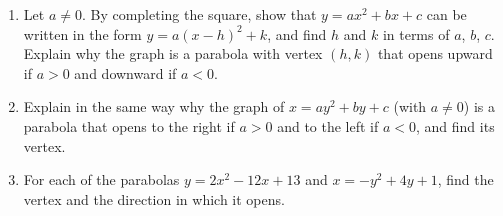 \begin{enumerate}
\item[(a)] Let $a\ne0$. By completing the square, show that $y=ax^2+bx+c$ can be written in the form $y=a(x-h)^2+k$, and find $h$ and $k$ in terms of $a$, $b$, $c$. Explain why the graph is a parabola with vertex $(h,k)$ that opens upward if $a>0$ and downward if $a<0$.
\item[(b)] Explain in the same way why the graph of $x=ay^2+by+c$ (with $a\ne0$) is a parabola that opens to the right if $a>0$ and to the left if $a<0$, and find its vertex.
\item[(c)] For each of the parabolas $y=2x^2-12x+13$ and $x=-y^2+4y+1$, find the vertex and the direction in which it opens.
\end{enumerate}
